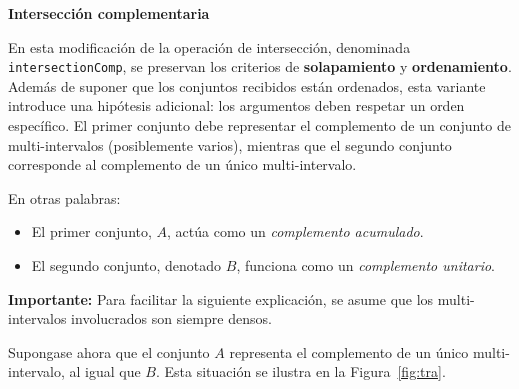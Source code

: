 {\bf Intersección complementaria}

En esta modificación de la operación de intersección, denominada \texttt{intersectionComp}, se preservan los criterios de \textbf{solapamiento} y \textbf{ordenamiento}. Además de suponer que los conjuntos recibidos están ordenados, esta variante introduce una hipótesis adicional: los argumentos deben respetar un orden específico. El primer conjunto debe representar el complemento de un conjunto de multi-intervalos (posiblemente varios), mientras que el segundo conjunto corresponde al complemento de un único multi-intervalo. 

En otras palabras:
\begin{itemize}
    \item El primer conjunto, $A$, actúa como un \emph{complemento acumulado}.
    \item El segundo conjunto, denotado $B$, funciona como un \emph{complemento unitario}.
\end{itemize}

\textbf{Importante:} Para facilitar la siguiente explicación, se asume que los multi-intervalos involucrados son siempre densos.

Supongase ahora que el conjunto $A$ representa el complemento de un único multi-intervalo, al igual que $B$. Esta situación se ilustra en la Figura~\ref{fig:tra}.

